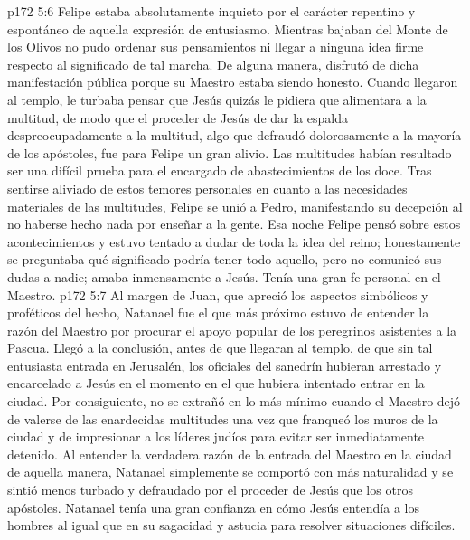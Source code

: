 \vs p172 5:6 \pc Felipe estaba absolutamente inquieto por el carácter repentino y espontáneo de aquella expresión de entusiasmo. Mientras bajaban del Monte de los Olivos no pudo ordenar sus pensamientos ni llegar a ninguna idea firme respecto al significado de tal marcha. De alguna manera, disfrutó de dicha manifestación pública porque su Maestro estaba siendo honesto. Cuando llegaron al templo, le turbaba pensar que Jesús quizás le pidiera que alimentara a la multitud, de modo que el proceder de Jesús de dar la espalda despreocupadamente a la multitud, algo que defraudó dolorosamente a la mayoría de los apóstoles, fue para Felipe un gran alivio. Las multitudes habían resultado ser una difícil prueba para el encargado de abastecimientos de los doce. Tras sentirse aliviado de estos temores personales en cuanto a las necesidades materiales de las multitudes, Felipe se unió a Pedro, manifestando su decepción al no haberse hecho nada por enseñar a la gente. Esa noche Felipe pensó sobre estos acontecimientos y estuvo tentado a dudar de toda la idea del reino; honestamente se preguntaba qué significado podría tener todo aquello, pero no comunicó sus dudas a nadie; amaba inmensamente a Jesús. Tenía una gran fe personal en el Maestro.
\vs p172 5:7 \pc Al margen de Juan, que apreció los aspectos simbólicos y proféticos del hecho, Natanael fue el que más próximo estuvo de entender la razón del Maestro por procurar el apoyo popular de los peregrinos asistentes a la Pascua. Llegó a la conclusión, antes de que llegaran al templo, de que sin tal entusiasta entrada en Jerusalén, los oficiales del sanedrín hubieran arrestado y encarcelado a Jesús en el momento en el que hubiera intentado entrar en la ciudad. Por consiguiente, no se extrañó en lo más mínimo cuando el Maestro dejó de valerse de las enardecidas multitudes una vez que franqueó los muros de la ciudad y de impresionar a los líderes judíos para evitar ser inmediatamente detenido. Al entender la verdadera razón de la entrada del Maestro en la ciudad de aquella manera, Natanael simplemente se comportó con más naturalidad y se sintió menos turbado y defraudado por el proceder de Jesús que los otros apóstoles. Natanael tenía una gran confianza en cómo Jesús entendía a los hombres al igual que en su sagacidad y astucia para resolver situaciones difíciles.
